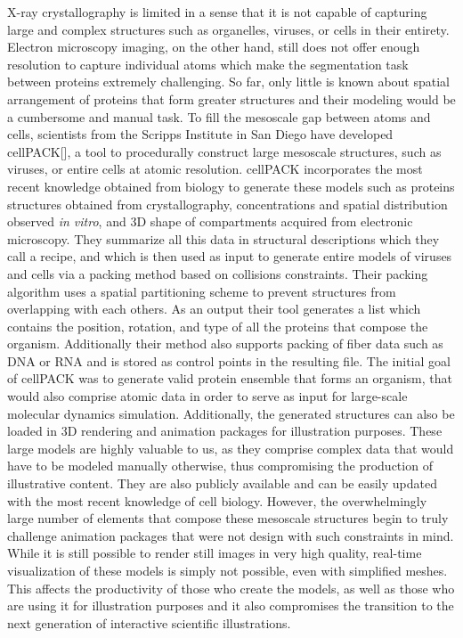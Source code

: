 X-ray crystallography is limited in a sense that it is not capable of capturing large and complex structures such as organelles, viruses, or cells in their entirety.
Electron microscopy imaging, on the other hand, still does not offer enough resolution to capture individual atoms which make the segmentation task between proteins extremely challenging.
So far, only little is known about spatial arrangement of proteins that form greater structures and their modeling would be a cumbersome and manual task.
To fill the mesoscale gap between atoms and cells, scientists from the Scripps Institute in San Diego have developed cellPACK[], a tool to procedurally construct large mesoscale structures, such as viruses, or entire cells at atomic resolution.
cellPACK incorporates the most recent knowledge obtained from biology to generate these models such as proteins structures obtained from crystallography, concentrations and spatial distribution observed \textit{in vitro}, and 3D shape of compartments acquired from electronic microscopy.
They summarize all this data in structural descriptions which they call a recipe, and which is then used as input to generate entire models of viruses and cells via a packing method based on collisions constraints.
Their packing algorithm uses a spatial partitioning scheme to prevent structures from overlapping with each others.
As an output their tool generates a list which contains the position, rotation, and type of all the proteins that compose the organism.
Additionally their method also supports packing of fiber data such as DNA or RNA and is stored as control points in the resulting file.
The initial goal of cellPACK was to generate valid protein ensemble that forms an organism, that would also comprise atomic data in order to serve as input for large-scale molecular dynamics simulation.
Additionally, the generated structures can also be loaded in 3D rendering and animation packages for illustration purposes.
These large models are highly valuable to us, as they comprise complex data that would have to be modeled manually otherwise, thus compromising the production of illustrative content.
They are also publicly available and can be easily updated with the most recent knowledge of cell biology.
However, the overwhelmingly large number of elements that compose these mesoscale structures begin to truly challenge animation packages that were not design with such constraints in mind.
While it is still possible to render still images in very high quality, real-time visualization of these models is simply not possible, even with simplified meshes. 
This affects the productivity of those who create the models, as well as those who are using it for illustration purposes and it also compromises the transition to the next generation of interactive scientific illustrations.


